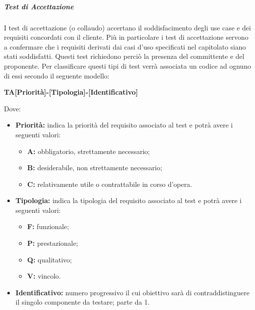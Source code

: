         \subparagraph*{Test di Accettazione}
            	I test di accettazione (o collaudo) accertano il soddisfacimento degli use case e dei requisiti concordati con il cliente.
                Più in particolare i test di accettazione servono a confermare che i requisiti derivati dai casi d'uso specificati nel capitolato siano stati soddisfatti. Questi test richiedono perciò la presenza del committente e del proponente.  
                Per classificare questi tipi di test verrà associata un codice ad ognuno di essi secondo il seguente modello:
                
                \begin{center}
                	\textbf{TA[Priorità]-[Tipologia]-[Identificativo]}
                \end{center}
                Dove: 
                
                \begin{itemize}
	                \item \textbf{Priorità:} indica la priorità del requisito associato al test e potrà avere i seguenti valori:
		                \begin{itemize}
		                    \item \textbf{A:} obbligatorio, strettamente necessario;
		                    \item \textbf{B:} desiderabile, non strettamente necessario;
		                    \item \textbf{C:} relativamente utile o contrattabile in corso d'opera. 
		                \end{itemize} 
	                \item \textbf{Tipologia:} indica la tipologia del requisito associato al test e potrà avere i seguenti valori:
		                \begin{itemize}
		                    \item \textbf{F:} funzionale;
		                    \item \textbf{P:} prestazionale;
		                    \item \textbf{Q:} qualitativo;
		                    \item \textbf{V:} vincolo.
		                \end{itemize}
	                \item \textbf{Identificativo:} numero progressivo il cui obiettivo sarà di contraddistinguere il singolo componente da testare; parte da 1.
                \end{itemize}

